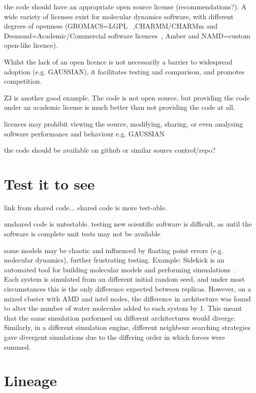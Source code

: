 \documentclass[conference]{IEEEtran}
\begin{document}
the code should have an appropriate open source license
(recommendations?). A wide variety of licenses exist for molecular
dynamics software, with different degrees of openness (GROMACS=LGPL~\cite{Hess2008}
,CHARMM/CHARMm and Desmond=Academic/Commercial software licences~\cite{Brooks2009,Bowers2006}, Amber
and NAMD=custom open-like licence).

Whilst the lack of an open licence is not necessarily a barrier to
widespread adoption (e.g. GAUSSIAN), it facilitates testing and
comparison, and promotes competition.

Z3 is another good example. The code is not open source, but providing
the code under an academic license is much better than not providing
the code at all.

licences may prohibit viewing the source, modifying, sharing, or even
analysing software performance and behaviour e.g. GAUSSIAN~\cite{Giles2004}

the code should be available on github or similar source control/repo?

\section{Test it to see}
link from shared code... shared code is more test-able. 

unshared code is untestable.  testing new scientific software is
difficult, as until the software is complete unit tests may not be
available

some models may be chaotic and influenced by floating point errors
(e.g. molecular dynamics), further frustrating testing. Example:
Sidekick is an automated tool for building molecular models and
performing simualations~\cite{Hall2014Sidekick}. Each system is
simulated from an different initial random seed, and under most
circumstances this is the only difference expected between
replicas. However, on a mixed cluster with AMD and intel nodes, the
difference in architecture was found to alter the number of water
molecules added to each system by 1. This meant that the same
simulation performed on different architectures would
diverge. Similarly, in a different simulation engine, different
neighbour searching strategies gave divergent simulations due to the
differing order in which forces were summed.



\section{Lineage} 
\end{document}
